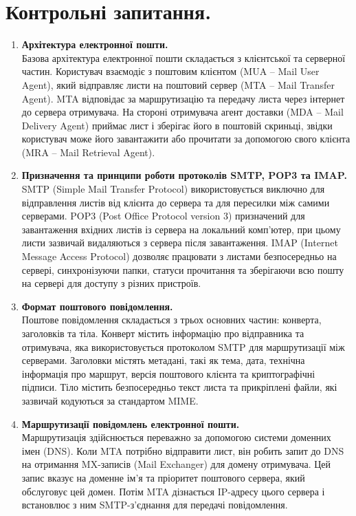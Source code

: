 \documentclass[14pt, a4paper]{extreport}
\begin{document}
	\section*{Контрольні запитання.}
	
	\begin{enumerate}
		\item \textbf{Архітектура електронної пошти.} \\ Базова архітектура електронної пошти складається з клієнтської та серверної частин. Користувач взаємодіє з поштовим клієнтом (MUA -- Mail User Agent), який відправляє листи на поштовий сервер (MTA -- Mail Transfer Agent). MTA відповідає за маршрутизацію та передачу листа через інтернет до сервера отримувача. На стороні отримувача агент доставки (MDA -- Mail Delivery Agent) приймає лист і зберігає його в поштовій скриньці, звідки користувач може його завантажити або прочитати за допомогою свого клієнта (MRA -- Mail Retrieval Agent).
		
		\item \textbf{Призначення та принципи роботи протоколів SMTP, POP3 та IMAP.} \\ SMTP (Simple Mail Transfer Protocol) використовується виключно для відправлення листів від клієнта до сервера та для пересилки між самими серверами. POP3 (Post Office Protocol version 3) призначений для завантаження вхідних листів із сервера на локальний комп'ютер, при цьому листи зазвичай видаляються з сервера після завантаження. IMAP (Internet Message Access Protocol) дозволяє працювати з листами безпосередньо на сервері, синхронізуючи папки, статуси прочитання та зберігаючи всю пошту на сервері для доступу з різних пристроїв.
		
		\item \textbf{Формат поштового повідомлення.} \\ Поштове повідомлення складається з трьох основних частин: конверта, заголовків та тіла. Конверт містить інформацію про відправника та отримувача, яка використовується протоколом SMTP для маршрутизації між серверами. Заголовки містять метадані, такі як тема, дата, технічна інформація про маршрут, версія поштового клієнта та криптографічні підписи. Тіло містить безпосередньо текст листа та прикріплені файли, які зазвичай кодуються за стандартом MIME.
		
		\item \textbf{Маршрутизації повідомлень електронної пошти.} \\ Маршрутизація здійснюється переважно за допомогою системи доменних імен (DNS). Коли MTA потрібно відправити лист, він робить запит до DNS на отримання MX-записів (Mail Exchanger) для домену отримувача. Цей запис вказує на доменне ім'я та пріоритет поштового сервера, який обслуговує цей домен. Потім MTA дізнається IP-адресу цього сервера і встановлює з ним SMTP-з'єднання для передачі повідомлення.
		

\end{enumerate}
\end{document}

